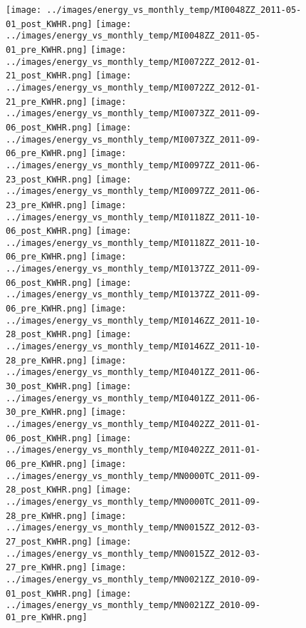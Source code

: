 \clearpage
\begin{figure}
\centering
\texttt{[image: ../images/energy\_vs\_monthly\_temp/MI0048ZZ\_2011-05-01\_post\_KWHR.png]}
\texttt{[image: ../images/energy\_vs\_monthly\_temp/MI0048ZZ\_2011-05-01\_pre\_KWHR.png]}
\texttt{[image: ../images/energy\_vs\_monthly\_temp/MI0072ZZ\_2012-01-21\_post\_KWHR.png]}
\texttt{[image: ../images/energy\_vs\_monthly\_temp/MI0072ZZ\_2012-01-21\_pre\_KWHR.png]}
\texttt{[image: ../images/energy\_vs\_monthly\_temp/MI0073ZZ\_2011-09-06\_post\_KWHR.png]}
\texttt{[image: ../images/energy\_vs\_monthly\_temp/MI0073ZZ\_2011-09-06\_pre\_KWHR.png]}
\texttt{[image: ../images/energy\_vs\_monthly\_temp/MI0097ZZ\_2011-06-23\_post\_KWHR.png]}
\texttt{[image: ../images/energy\_vs\_monthly\_temp/MI0097ZZ\_2011-06-23\_pre\_KWHR.png]}
\texttt{[image: ../images/energy\_vs\_monthly\_temp/MI0118ZZ\_2011-10-06\_post\_KWHR.png]}
\texttt{[image: ../images/energy\_vs\_monthly\_temp/MI0118ZZ\_2011-10-06\_pre\_KWHR.png]}
\texttt{[image: ../images/energy\_vs\_monthly\_temp/MI0137ZZ\_2011-09-06\_post\_KWHR.png]}
\texttt{[image: ../images/energy\_vs\_monthly\_temp/MI0137ZZ\_2011-09-06\_pre\_KWHR.png]}
\texttt{[image: ../images/energy\_vs\_monthly\_temp/MI0146ZZ\_2011-10-28\_post\_KWHR.png]}
\texttt{[image: ../images/energy\_vs\_monthly\_temp/MI0146ZZ\_2011-10-28\_pre\_KWHR.png]}
\texttt{[image: ../images/energy\_vs\_monthly\_temp/MI0401ZZ\_2011-06-30\_post\_KWHR.png]}
\texttt{[image: ../images/energy\_vs\_monthly\_temp/MI0401ZZ\_2011-06-30\_pre\_KWHR.png]}
\texttt{[image: ../images/energy\_vs\_monthly\_temp/MI0402ZZ\_2011-01-06\_post\_KWHR.png]}
\texttt{[image: ../images/energy\_vs\_monthly\_temp/MI0402ZZ\_2011-01-06\_pre\_KWHR.png]}
\texttt{[image: ../images/energy\_vs\_monthly\_temp/MN0000TC\_2011-09-28\_post\_KWHR.png]}
\texttt{[image: ../images/energy\_vs\_monthly\_temp/MN0000TC\_2011-09-28\_pre\_KWHR.png]}
\texttt{[image: ../images/energy\_vs\_monthly\_temp/MN0015ZZ\_2012-03-27\_post\_KWHR.png]}
\texttt{[image: ../images/energy\_vs\_monthly\_temp/MN0015ZZ\_2012-03-27\_pre\_KWHR.png]}
\texttt{[image: ../images/energy\_vs\_monthly\_temp/MN0021ZZ\_2010-09-01\_post\_KWHR.png]}
\texttt{[image: ../images/energy\_vs\_monthly\_temp/MN0021ZZ\_2010-09-01\_pre\_KWHR.png]}
\end{figure}
